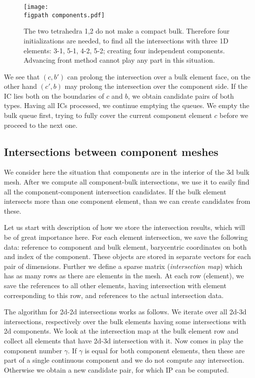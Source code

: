 \documentclass{elsarticle}
\newcommand{\figpath}{figures/}
\begin{document}
\begin{figure}[!htb]
    \centering
    \texttt{[image: \\figpath components.pdf]}
    \caption{The two tetrahedra 1,2 do not make a compact bulk. Therefore four initializations are needed,
    to find all the intersections with three 1D elements: 3-1, 5-1, 4-2, 5-2; creating four independent components. Advancing front method cannot play any part in this situation.}
    \label{fig:components}
\end{figure}

We see that $(c, b')$ can prolong the intersection over a bulk element face, on the other hand $(c', b)$ 
may prolong the intersection over the component side. If the IC lies both on the boundaries of $c$ and $b$,
we obtain candidate pairs of both types. Having all ICs processed, we continue emptying the queues. We empty the bulk queue first,
trying to fully cover the current component element $c$ before we proceed to the next one. 

\subsection{Intersections between component meshes}
\label{sec:components}
We consider here the situation that components are in the interior of the 3d bulk mesh. After we compute
all component-bulk intersections, we use it to easily find all the component-component intersection candidates.
If the bulk element intersects more than one component element, than we can create candidates from these.

Let us start with description of how we store the intersection results, which will be of great importance here.
For each element intersection, we save the following data: reference to component and bulk element, 
barycentric coordinates on both and index of the component. These objects are stored in separate vectors for each pair 
of dimensions. Further we define a sparse matrix (\emph{intersection map}) which has as many rows as there are elements in the mesh.
At each row (element), we save the references to all other elements, having intersection with element corresponding to this row, 
and references to the actual intersection data.

The algorithm for 2d-2d intersections works as follows. We iterate over all 2d-3d intersections, respectively over
the bulk elements having some intersections with 2d components. We look at the intersection map at the
bulk element row and collect all elements that have 2d-3d intersection with it.
Now comes in play the component number $\gamma$. If $\gamma$ is equal for both component elements, then 
these are part of a single continuous component and we do not compute any intersection.
Otherwise we obtain a new candidate pair, for which IP can be computed.
\end{document}
